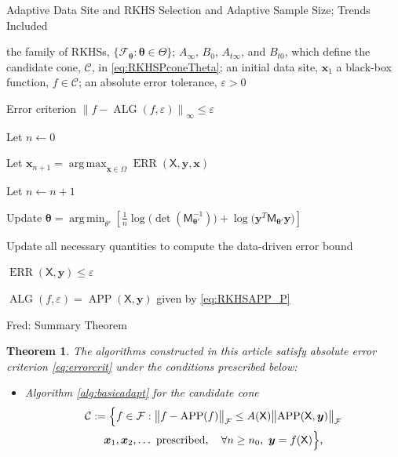\documentclass[]{mcom-l}
\theoremstyle{theorem}
\newtheorem{theorem}{Theorem}
\theoremstyle{remark}
\DeclareMathOperator*{\argmax}{arg\,max}
\DeclareMathOperator*{\argmin}{arg\,min}
\DeclareMathOperator{\ALG}{ALG}
\DeclareMathOperator{\ERR}{ERR}
\DeclareMathOperator{\APP}{APP}
\newcommand{\mM}{\mathsf{M}}
\newcommand{\mX}{\mathsf{X}}
\newcommand{\bx}{{\boldsymbol{x}}}
\newcommand{\by}{{\boldsymbol{y}}}
\newcommand{\btheta}{{\boldsymbol{\theta}}}
\newcommand{\cc}{\mathcal{C}}
\newcommand{\calc}{{\mathcal{C}}}
\newcommand{\calf}{{\mathcal{F}}}
\newcommand{\norm}[2][{}]{\ensuremath{\left \lVert #2 \right \rVert}_{#1}}
\newcommand{\bignorm}[2][{}]{\ensuremath{\bigl \lVert #2 \bigr \rVert}_{#1}}
\newcommand{\FredNote}[1]{{\color{blue}Fred: #1}}
\begin{document}
\begin{algorithm}[H]
	\caption{Adaptive Data Site and RKHS Selection and Adaptive Sample Size; Trends Included \label{alg:trend}}
	\begin{algorithmic}
		\PARAM the family of RKHSs, $\{\calf_{\btheta} : \btheta \in \Theta\}$; $A_\infty$, $B_0$, $A_{t\infty}$, and  $B_{t0}$, which define the candidate cone, $\cc$, in \eqref{eq:RKHSPconeTheta}; an initial data site, $\bx_1$
		\INPUT a black-box function, $f \in \cc$; an absolute error tolerance, $\varepsilon>0$
		
		\Ensure Error criterion $\norm[\infty]{f - \ALG(f,\varepsilon)} \le \varepsilon$
		
		\State Let $n \leftarrow 0$
		
		\Repeat
		
		
		\State Let $ \bx_{n+1} = \displaystyle \argmax_{\bx \in \Omega} \ERR(\mX,\by,\bx)$
		
		\EndIf
		
		\State Let $n \leftarrow n + 1$
		
		\State Update $\displaystyle\btheta = \argmin_{\theta'}  \left[\frac 1n \log \bigl( \det(\mM^{-1}_{\btheta'}) \bigr) + \log \bigl ( \by^T \mM_{\btheta'} \by \bigr)\right]$
		
		\State Update all necessary quantities to compute the data-driven error bound
		
		\Until  $\ERR(\mX,\by) \le \varepsilon$
		
		\RETURN $\ALG(f,\varepsilon) = \APP(\mX,\by)$ given by \eqref{eq:RKHSAPP_P}
		
	\end{algorithmic}
\end{algorithm}



\FredNote{Summary Theorem}

\begin{theorem}
	The algorithms constructed in this article satisfy absolute error criterion \eqref{eq:errorcrit} under the conditions prescribed below:
	\begin{itemize}
		\item Algorithm \ref{alg:basicadapt} for the candidate cone
		\begin{multline}
		\label{eq:finalconeOne}
		\calc := 
		\Bigl \{f \in \calf : \bignorm[\calf]{f - \APP(f)} \le A(\mX) \bignorm[\calf]{\APP(\mX,\by)} \\
		\bx_1, \bx_2, \ldots \text{ prescribed}, \quad \forall n \ge n_0,  \ \by = f(\mX) \Bigr \},
		\end{multline}
	\end{itemize}
\end{theorem}
\end{document}
